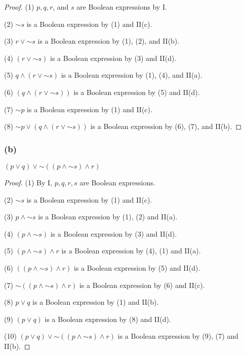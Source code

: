 \documentclass[14pt]{extarticle}
\begin{document}
\begin{proof}
    (1) $p, q, r$, and $s$ are Boolean expressions by I.

    (2) \({\sim s}\) is a Boolean expression by (1) and II(c).

    (3) \(r \vee {\sim s}\) is a Boolean expression by (1), (2), and II(b).

    (4) \((r \vee {\sim s})\) is a Boolean expression by (3) and II(d).

    (5) \(q \wedge (r \vee {\sim s})\) is a Boolean expression by (1), (4), and II(a).

    (6) \((q \wedge (r \vee {\sim s}))\) is a Boolean expression by (5) and II(d).

    (7) \({\sim p}\) is a Boolean expression by (1) and II(c).

    (8) \({\sim p} \vee (q \wedge (r \vee {\sim s}))\) is a Boolean expression by (6), (7), and II(b).
\end{proof}

\subsubsection{(b)}
\((p \vee q) \vee {\sim ((p \wedge {\sim s}) \wedge r)}\)

\begin{proof}
    (1) By I, $p, q, r, s$ are Boolean expressions.

    (2) \({\sim s}\) is a Boolean expression by (1) and II(c).

    (3) \(p \wedge {\sim s}\) is a Boolean expression by (1), (2) and II(a).

    (4) \((p \wedge {\sim s})\) is a Boolean expression by (3) and II(d).

    (5) \((p \wedge {\sim s}) \wedge r\) is a Boolean expression by (4), (1) and II(a).

    (6) \(((p \wedge {\sim s}) \wedge r)\) is a Boolean expression by (5) and II(d).

    (7) \({\sim ((p \wedge {\sim s}) \wedge r)}\) is a Boolean expression by (6) and II(c).

    (8) \(p \vee q\) is a Boolean expression by (1) and II(b).

    (9) \((p \vee q)\) is a Boolean expression by (8) and II(d).

    (10) \((p \vee q) \vee {\sim ((p \wedge {\sim s}) \wedge r)}\) is a Boolean expression by (9), (7) and II(b).
\end{proof}
\end{document}
